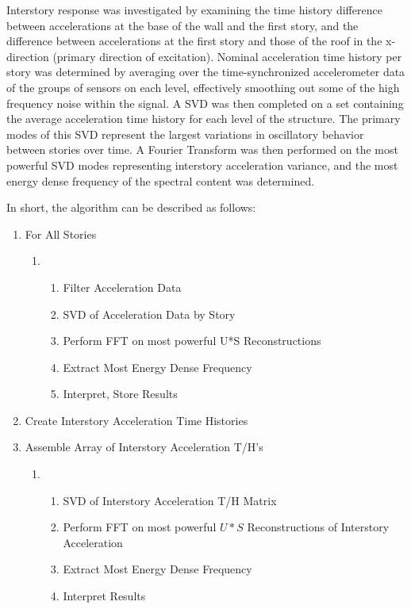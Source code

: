 \documentclass{article}
\begin{document}
Interstory response was investigated by examining the time history difference between accelerations at the base of the wall and the first story, and the difference between accelerations at the first story and those of the roof in the x-direction (primary direction of excitation). Nominal acceleration time history per story was determined by averaging over the time-synchronized accelerometer data of the groups of sensors on each level, effectively smoothing out some of the high frequency noise within the signal. A SVD was then completed on a set containing the average acceleration time history for each level of the structure. The primary modes of this SVD represent the largest variations in oscillatory behavior between stories over time. A Fourier Transform was then performed on the most powerful SVD modes representing interstory acceleration variance, and the most energy dense frequency of the spectral content was determined. 
\par In short, the algorithm can be described as follows:\\
\item 
    \begin{enumerate}
      \item For All Stories
      \begin{enumerate}
        \item[]%
        \begin{enumerate}
          \item Filter Acceleration Data
          \item SVD of Acceleration Data by Story
          \item Perform FFT on most powerful U*S Reconstructions
          \item Extract Most Energy Dense Frequency
          \item Interpret, Store Results
        \end{enumerate}
      \end{enumerate}
  
      \item Create Interstory Acceleration Time Histories 
      \item Assemble Array of Interstory Acceleration T/H's
      \begin{enumerate}
        \item[]
        \begin{enumerate}
          \item SVD of Interstory Acceleration T/H Matrix 
          \item Perform FFT on most powerful $U*S$ Reconstructions of Interstory Acceleration
          \item Extract Most Energy Dense Frequency
          \item Interpret Results
        \end{enumerate}
      \end{enumerate}
    \end{enumerate}
\end{document}
